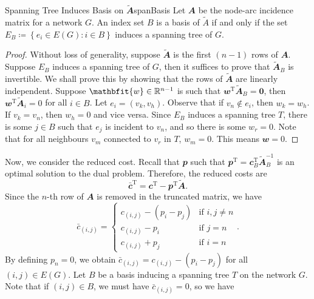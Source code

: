 \documentclass[math, code]{amznotes}
\theoremstyle{remark}
\begin{document}
\begin{probox}{Spanning Tree Induces Basis on $\tilde{\mathbfit{A}}$}{spanBasis}
    Let $\mathbfit{A}$ be the node-arc incidence matrix for a network $G$. An index set $B$ is a basis of $\tilde{A}$ if and only if the set $E_B \coloneqq \left\{e_i \in E(G) \colon i \in B\right\}$ induces a spanning tree of $G$.
    \tcblower
    \begin{proof}
        Without loss of generality, suppose $\tilde{\mathbfit{A}}$ is the first $(n - 1)$ rows of $\mathbfit{A}$. Suppose $E_B$ induces a spanning tree of $G$, then it suffices to prove that $\tilde{\mathbfit{A}}_B$ is invertible. We shall prove this by showing that the rows of $\tilde{\mathbfit{A}}$ are linearly independent. Suppose $\mathbfit{w} \in \R^{n - 1}$ is such that $\mathbfit{w}^{\mathrm{T}}\tilde{\mathbfit{A}}_B = \mathbf{0}$, then $\mathbfit{w}^{\mathrm{T}}\tilde{\mathbfit{A}}_i = 0$ for all $i \in B$. Let $e_i = (v_k, v_h)$. Observe that if $v_n \notin e_i$, then $w_k = w_h$. If $v_k = v_n$, then $w_h = 0$ and vice versa. Since $E_B$ induces a spanning tree $T$, there is some $j \in B$ such that $e_j$ is incident to $v_n$, and so there is some $w_r = 0$. Note that for all neighbours $v_m$ connected to $v_r$ in $T$, $w_m = 0$. This means $\mathbfit{w} = 0$.
    \end{proof}
\end{probox}
Now, we consider the reduced cost. Recall that $\mathbfit{p}$ such that $\mathbfit{p}^{\mathrm{T}} = \mathbfit{c}^{\mathrm{T}}_B\tilde{\mathbfit{A}}_B^{-1}$ is an optimal solution to the dual problem. Therefore, the reduced costs are 
\begin{equation*}
    \bar{\mathbfit{c}}^{\mathrm{T}} = \mathbfit{c}^{\mathrm{T}} - \mathbfit{p}^{\mathrm{T}}\tilde{\mathbfit{A}}.
\end{equation*}
Since the $n$-th row of $\mathbfit{A}$ is removed in the truncated matrix, we have 
\begin{equation*}
    \bar{c}_{(i, j)} = \begin{cases}
        c_{(i, j)} - (p_i - p_j) & \textrm{if } i, j \neq n \\
        c_{(i, j)} - p_i & \textrm{if } j = n \\
        c_{(i, j)} + p_j & \textrm{if } i = n
    \end{cases}.
\end{equation*}
By defining $p_n = 0$, we obtain $\bar{c}_{(i, j)} = c_{(i, j)} - (p_i - p_j)$ for all $(i, j) \in E(G)$. Let $B$ be a basis inducing a spanning tree $T$ on the network $G$. Note that if $(i, j) \in B$, we must have $\bar{c}_{(i, j)} = 0$, so we have 
\end{document}
